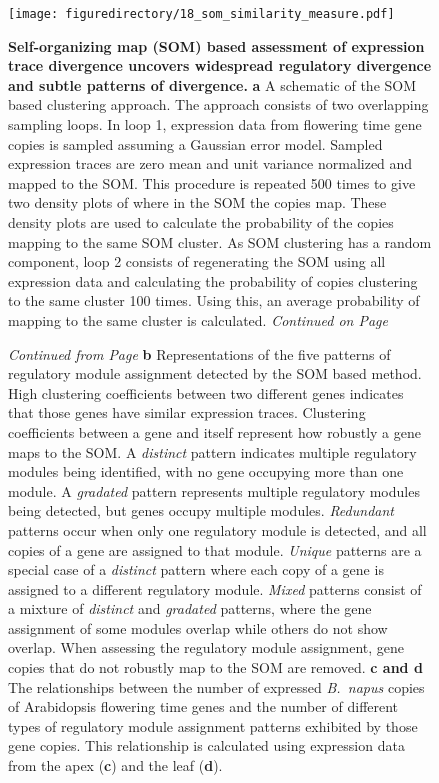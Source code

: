 \documentclass[12pt,]{book}
\begin{document}
\begin{figure}[htbp]
\centering
\texttt{[image: figuredirectory/18\_som\_similarity\_measure.pdf]}
\caption{\textbf{Self-organizing map (SOM) based assessment of
expression trace divergence uncovers widespread regulatory divergence
and subtle patterns of divergence.} \textbf{a} A schematic of the SOM
based clustering approach. The approach consists of two overlapping
sampling loops. In loop 1, expression data from flowering time gene
copies is sampled assuming a Gaussian error model. Sampled expression
traces are zero mean and unit variance normalized and mapped to the SOM.
This procedure is repeated 500 times to give two density plots of where
in the SOM the copies map. These density plots are used to calculate the
probability of the copies mapping to the same SOM cluster. As SOM
clustering has a random component, loop 2 consists of regenerating the
SOM using all expression data and calculating the probability of copies
clustering to the same cluster 100 times. Using this, an average
probability of mapping to the same cluster is calculated.
\emph{Continued on Page
\pageref{figure:218:somsimilaritylegend}}}\label{figure:218:somsimilarity}
\end{figure}

\addtocounter{figure}{-1}

\begin{figure} [t!]
\caption{\emph{Continued from Page \pageref{figure:218:somsimilarity}} \textbf{b} Representations of the five patterns of regulatory module assignment detected by the SOM based method. High clustering coefficients between two different genes indicates that those genes have similar expression traces. Clustering coefficients between a gene and itself represent how robustly a gene maps to the SOM. A \emph{distinct} pattern indicates multiple regulatory modules being identified, with no gene occupying more than one module. A \emph{gradated} pattern represents multiple regulatory modules being detected, but genes occupy multiple modules. \emph{Redundant} patterns occur when only one regulatory module is detected, and all copies of a gene are assigned to that module. \emph{Unique} patterns are a special case of a \emph{distinct} pattern where each copy of a gene is assigned to a different regulatory module. \emph{Mixed} patterns consist of a mixture of \emph{distinct} and \emph{gradated} patterns, where the gene assignment of some modules overlap while others do not show overlap. When assessing the regulatory module assignment, gene copies that do not robustly map to the SOM are removed. \textbf{c and d} The relationships between the number of expressed \emph{B.\ napus} copies of Arabidopsis flowering time genes and the number of different types of regulatory module assignment patterns exhibited by those gene copies. This relationship is calculated using expression data from the apex (\textbf{c}) and the leaf (\textbf{d}).}%
\label{figure:218:somsimilaritylegend}
\end{figure}
\end{document}
